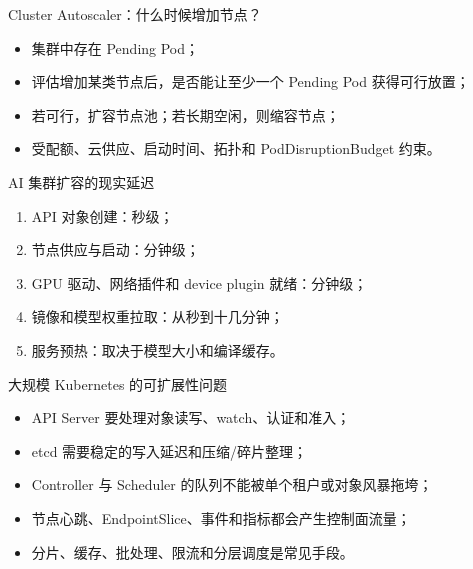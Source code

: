 \documentclass[UTF8,fontset=none,aspectratio=169,10pt]{beamer}
\begin{document}

\begin{frame}{Cluster Autoscaler：什么时候增加节点？}
\begin{itemize}
  \item 集群中存在 Pending Pod；
  \item 评估增加某类节点后，是否能让至少一个 Pending Pod 获得可行放置；
  \item 若可行，扩容节点池；若长期空闲，则缩容节点；
  \item 受配额、云供应、启动时间、拓扑和 PodDisruptionBudget 约束。
\end{itemize}
\vfill
{}
\end{frame}

\begin{frame}{AI 集群扩容的现实延迟}
\begin{enumerate}
  \item API 对象创建：秒级；
  \item 节点供应与启动：分钟级；
  \item GPU 驱动、网络插件和 device plugin 就绪：分钟级；
  \item 镜像和模型权重拉取：从秒到十几分钟；
  \item 服务预热：取决于模型大小和编译缓存。
\end{enumerate}
\vfill
{}
\end{frame}

\begin{frame}{大规模 Kubernetes 的可扩展性问题}
\begin{itemize}
  \item API Server 要处理对象读写、watch、认证和准入；
  \item etcd 需要稳定的写入延迟和压缩/碎片整理；
  \item Controller 与 Scheduler 的队列不能被单个租户或对象风暴拖垮；
  \item 节点心跳、EndpointSlice、事件和指标都会产生控制面流量；
  \item 分片、缓存、批处理、限流和分层调度是常见手段。
\end{itemize}
\end{frame}
\end{document}
